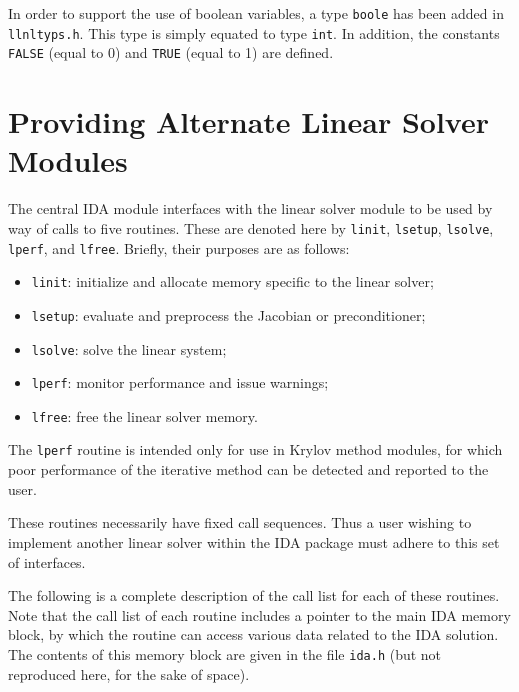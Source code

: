 In order to support the use of boolean variables, a type {\tt boole}
has been added in {\tt llnltyps.h}.  This type is simply equated to
type {\tt int}.  In addition, the constants {\tt FALSE} (equal to 0)
and {\tt TRUE} (equal to 1) are defined.


\section{Providing Alternate Linear Solver Modules}

The central IDA module interfaces with the linear solver module to be
used by way of calls to five routines.  These are denoted here by 
{\tt linit}, {\tt lsetup}, {\tt lsolve}, {\tt lperf}, and {\tt lfree}.
Briefly, their purposes are as follows:
\begin{itemize}
\item {\tt linit}: initialize and allocate memory specific to the
linear solver;
\item {\tt lsetup}: evaluate and preprocess the Jacobian or preconditioner;
\item {\tt lsolve}: solve the linear system;
\item {\tt lperf}: monitor performance and issue warnings;
\item {\tt lfree}: free the linear solver memory.
\end{itemize}
The {\tt lperf} routine is intended only for use in Krylov method
modules, for which poor performance of the iterative method can be 
detected and reported to the user.

These routines necessarily have fixed call sequences.  Thus a user
wishing to implement another linear solver within the IDA package must
adhere to this set of interfaces.

The following is a complete description of the call list for each of
these routines.  Note that the call list of each routine includes a
pointer to the main IDA memory block, by which the routine can access
various data related to the IDA solution.  The contents of this memory
block are given in the file {\tt ida.h} (but not reproduced here, for
the sake of space).

